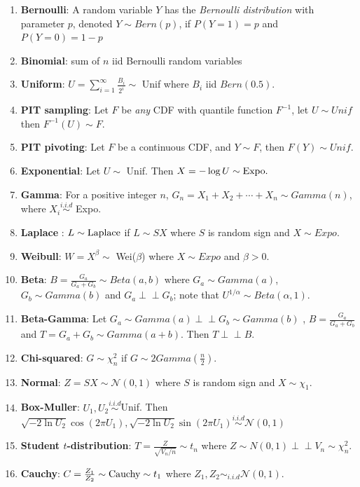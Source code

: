 \documentclass[
  letterpaper,
  DIV=11,
  numbers=noendperiod]{scrreprt}
\theoremstyle{plain}
\theoremstyle{definition}
\theoremstyle{remark}
\begin{document}
\begin{enumerate}
\def\labelenumi{\arabic{enumi}.}
\item
  \textbf{Bernoulli}: A random variable \(Y\) has the \emph{Bernoulli
  distribution} with parameter \(p\), denoted \(Y\sim Bern(p)\), if
  \(P(Y=1)=p\) and \(P(Y=0)=1-p\)
\item
  \textbf{Binomial}: sum of \(n\) iid Bernoulli random variables
\item
  \textbf{Uniform}: \(U = \sum_{i=1}^\infty \frac{B_i}{2^i} \sim\) Unif
  where \(B_i\) iid \(Bern(0.5)\).
\item
  \textbf{PIT sampling}: Let \(F\) be \textit{any} CDF with quantile
  function \(F^{-1}\), let \(U \sim Unif\) then \(F^{-1}(U) \sim F.\)
\item
  \textbf{PIT pivoting}: Let \(F\) be a continuous CDF, and
  \(Y \sim F\), then \(F(Y)\sim Unif.\)
\item
  \textbf{Exponential}: Let \(U\sim\) Unif. Then
  \(X = -\log U \sim \textnormal{Expo}.\)
\item
  \textbf{Gamma}: For a positive integer \(n\),
  \(G_n= X_1+X_2+\cdots + X_n \sim Gamma(n)\), where
  \(X_i \overset{i.i.d}{\sim}\) Expo.
\item
  \textbf{Laplace} : \(L \sim \textnormal{Laplace}\) if \(L \sim SX\)
  where \(S\) is random sign and \(X\sim Expo.\)
\item
  \textbf{Weibull}: \(W = X^\beta \sim\) Wei(\(\beta\)) where
  \(X \sim Expo\) and \(\beta >0.\)
\item
  \textbf{Beta}: \(B = \frac{G_a}{G_a+G_b} \sim Beta(a,b)\) where
  \(G_a \sim Gamma(a)\), \(G_b\sim Gamma(b)\) and
  \(G_a \perp\!\!\!\!\perp G_b\); note that
  \(U^{1/\alpha} \sim Beta(\alpha,1).\)
\item
  \textbf{Beta-Gamma}: Let
  \(G_a \sim Gamma(a) \perp\!\!\!\!\perp G_b\sim Gamma(b)\) ,
  \(B = \frac{G_a}{G_a+G_b}\) and \(T = G_a + G_b \sim Gamma(a+b).\)
  Then \(T \perp\!\!\!\!\perp B.\)
\item
  \textbf{Chi-squared}: \(G \sim \chi_n^2\) if
  \(G\sim 2Gamma\left(\frac{n}{2}\right).\)
\item
  \textbf{Normal}: \(Z = SX \sim \mathcal{N}(0,1)\) where \(S\) is
  random sign and \(X\sim \chi_1.\)
\item
  \textbf{Box-Muller}: \(U_1,U_2 \overset{i.i.d}{\sim}\)Unif. Then
  \(\sqrt{-2\ln U_2}\cos{(2\pi U_1)}, \sqrt{-2\ln U_2}\sin{(2\pi U_1)} \overset{i.i.d}{\sim} \mathcal{N}(0,1)\)
\item
  \textbf{Student \(t\)-distribution}:
  \(T = \frac{Z}{\sqrt{V_n/n}} \sim t_n\) where
  \(Z \sim N(0,1) \perp\!\!\!\!\perp V_n \sim \chi_n^2.\)
\item
  \textbf{Cauchy}:
  \(C = \frac{Z_1}{Z_2} \sim \textnormal{Cauchy} \sim t_1\) where
  \(Z_1,Z_2 \sim_{i.i.d} \mathcal{N}(0,1)\).
\end{enumerate}
\end{document}
